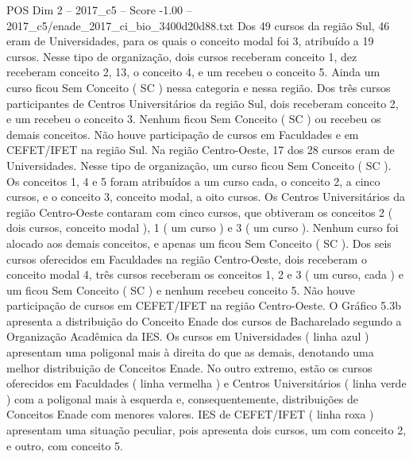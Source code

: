 \begin{textsample}{POS Dim 2 – 2017\_c5 – Score -1.00 – 2017\_c5/enade\_2017\_ci\_bio\_3400d20d88.txt}
Dos 49 cursos da região Sul, 46 eram de Universidades, para os quais o conceito modal foi 3, atribuído a 19 cursos.
Nesse tipo de organização, dois cursos receberam conceito 1, dez receberam conceito 2, 13, o conceito 4, e um recebeu o conceito 5.
Ainda um curso ficou Sem Conceito ( SC ) nessa categoria e nessa região.
Dos três cursos participantes de Centros Universitários da região Sul, dois receberam conceito 2, e um recebeu o conceito 3.
Nenhum ficou Sem Conceito ( SC ) ou recebeu os demais conceitos.
Não houve participação de cursos em Faculdades e em CEFET/IFET na região Sul.
Na região Centro-Oeste, 17 dos 28 cursos eram de Universidades.
Nesse tipo de organização, um curso ficou Sem Conceito ( SC ).
Os conceitos 1, 4 e 5 foram atribuídos a um curso cada, o conceito 2, a cinco cursos, e o conceito 3, conceito modal, a oito cursos.
Os Centros Universitários da região Centro-Oeste contaram com cinco cursos, que obtiveram os conceitos 2 ( dois cursos, conceito modal ), 1 ( um curso ) e 3 ( um curso ).
Nenhum curso foi alocado aos demais conceitos, e apenas um ficou Sem Conceito ( SC ).
Dos seis cursos oferecidos em Faculdades na região Centro-Oeste, dois receberam o conceito modal 4, três cursos receberam os conceitos 1, 2 e 3 ( um curso, cada ) e um ficou Sem Conceito ( SC ) e nenhum recebeu conceito 5.
Não houve participação de cursos em CEFET/IFET na região Centro-Oeste.
O Gráfico 5.3b apresenta a distribuição do Conceito Enade dos cursos de Bacharelado segundo a Organização Acadêmica da IES.
Os cursos em Universidades ( linha azul ) apresentam uma poligonal mais à direita do que as demais, denotando uma melhor distribuição de Conceitos Enade.
No outro extremo, estão os cursos oferecidos em Faculdades ( linha vermelha ) e Centros Universitários ( linha verde ) com a poligonal mais à esquerda e, consequentemente, distribuições de Conceitos Enade com menores valores.
IES de CEFET/IFET ( linha roxa ) apresentam uma situação peculiar, pois apresenta dois cursos, um com conceito 2, e outro, com conceito 5.

\end{textsample}
